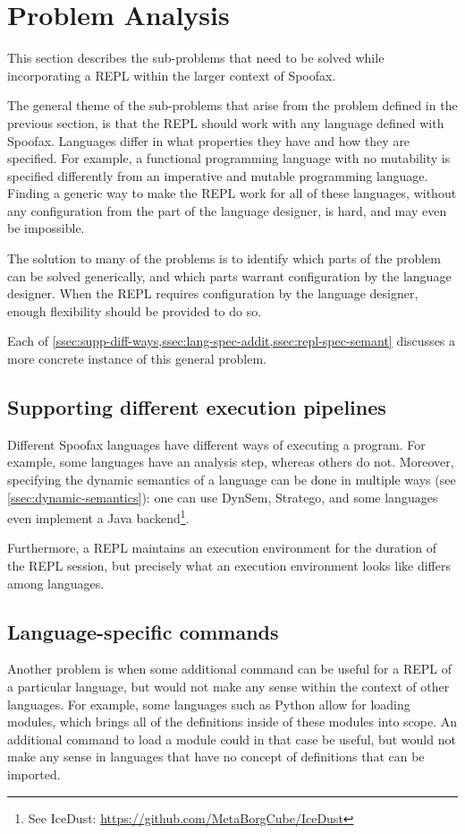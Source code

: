 \section{Problem Analysis}
\label{sec:problem-analysis}
This section describes the sub-problems that need to be solved while
incorporating a REPL within the larger context of Spoofax.

The general theme of the sub-problems that arise from the problem
defined in the previous section, is that the REPL should work
with any language defined with Spoofax. Languages differ in what
properties they have and how they are specified. For example, a
functional programming language with no mutability is specified
differently from an imperative and mutable programming
language. Finding a generic way to make the REPL work for all of these
languages, without any configuration from the part of the language
designer, is hard, and may even be impossible.

The solution to many of the problems is to identify which parts of the problem
can be solved generically, and which parts warrant configuration by the
language designer. When the REPL requires configuration by the language
designer, enough flexibility should be provided to do so.

Each of \cref{ssec:supp-diff-ways,ssec:lang-spec-addit,ssec:repl-spec-semant}
discusses a more concrete instance of this general problem.

\subsection{Supporting different execution pipelines}
\label{ssec:supp-diff-ways}
Different Spoofax languages have different ways of executing a program.
For example, some languages have an analysis step, whereas
others do not. Moreover, specifying the dynamic semantics of a language
can be done in multiple ways (see \cref{ssec:dynamic-semantics}): one
can use DynSem, Stratego, and some languages even implement a Java
backend\footnote{See IceDust:
  \url{https://github.com/MetaBorgCube/IceDust}}.

Furthermore, a REPL maintains an execution environment for the duration of the
REPL session, but precisely what an execution environment looks like differs
among languages.

\subsection{Language-specific commands}
\label{ssec:lang-spec-addit}
Another problem is when some additional command can be useful for a
REPL of a particular language, but would not make any sense within the
context of other languages. For example, some languages such as Python
allow for loading modules, which brings all of the definitions inside
of these modules into scope. An additional command to load a module
could in that case be useful, but would not make any sense in
languages that have no concept of definitions that can be imported.

